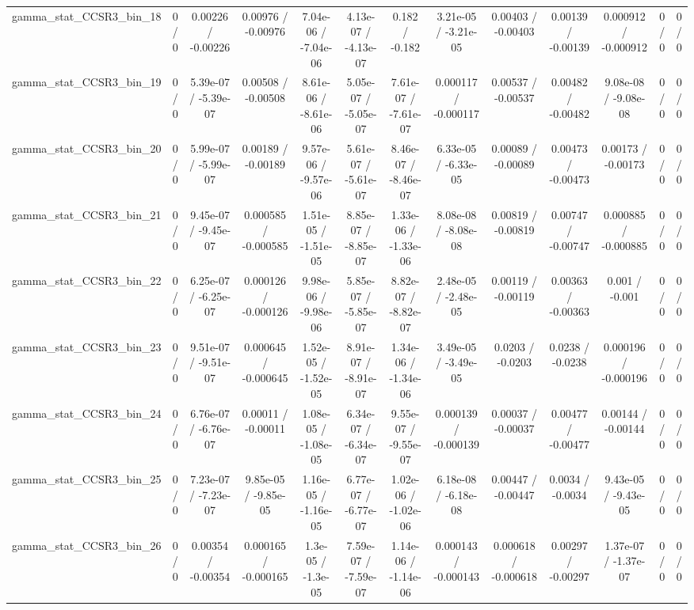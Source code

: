 \documentclass[10pt]{article}
\begin{document}
\begin{table}[htbp]
\begin{center}
\begin{tabular}{|c|c|c|c|c|c|c|c|c|c|c|c|c|}
  gamma_stat_CCSR3_bin_18 & 0 / 0 & 0.00226 / -0.00226 & 0.00976 / -0.00976 & 7.04e-06 / -7.04e-06 & 4.13e-07 / -4.13e-07 & 0.182 / -0.182 & 3.21e-05 / -3.21e-05 & 0.00403 / -0.00403 & 0.00139 / -0.00139 & 0.000912 / -0.000912 & 0 / 0 & 0 / 0 \\ 
  gamma_stat_CCSR3_bin_19 & 0 / 0 & 5.39e-07 / -5.39e-07 & 0.00508 / -0.00508 & 8.61e-06 / -8.61e-06 & 5.05e-07 / -5.05e-07 & 7.61e-07 / -7.61e-07 & 0.000117 / -0.000117 & 0.00537 / -0.00537 & 0.00482 / -0.00482 & 9.08e-08 / -9.08e-08 & 0 / 0 & 0 / 0 \\ 
  gamma_stat_CCSR3_bin_20 & 0 / 0 & 5.99e-07 / -5.99e-07 & 0.00189 / -0.00189 & 9.57e-06 / -9.57e-06 & 5.61e-07 / -5.61e-07 & 8.46e-07 / -8.46e-07 & 6.33e-05 / -6.33e-05 & 0.00089 / -0.00089 & 0.00473 / -0.00473 & 0.00173 / -0.00173 & 0 / 0 & 0 / 0 \\ 
  gamma_stat_CCSR3_bin_21 & 0 / 0 & 9.45e-07 / -9.45e-07 & 0.000585 / -0.000585 & 1.51e-05 / -1.51e-05 & 8.85e-07 / -8.85e-07 & 1.33e-06 / -1.33e-06 & 8.08e-08 / -8.08e-08 & 0.00819 / -0.00819 & 0.00747 / -0.00747 & 0.000885 / -0.000885 & 0 / 0 & 0 / 0 \\ 
  gamma_stat_CCSR3_bin_22 & 0 / 0 & 6.25e-07 / -6.25e-07 & 0.000126 / -0.000126 & 9.98e-06 / -9.98e-06 & 5.85e-07 / -5.85e-07 & 8.82e-07 / -8.82e-07 & 2.48e-05 / -2.48e-05 & 0.00119 / -0.00119 & 0.00363 / -0.00363 & 0.001 / -0.001 & 0 / 0 & 0 / 0 \\ 
  gamma_stat_CCSR3_bin_23 & 0 / 0 & 9.51e-07 / -9.51e-07 & 0.000645 / -0.000645 & 1.52e-05 / -1.52e-05 & 8.91e-07 / -8.91e-07 & 1.34e-06 / -1.34e-06 & 3.49e-05 / -3.49e-05 & 0.0203 / -0.0203 & 0.0238 / -0.0238 & 0.000196 / -0.000196 & 0 / 0 & 0 / 0 \\ 
  gamma_stat_CCSR3_bin_24 & 0 / 0 & 6.76e-07 / -6.76e-07 & 0.00011 / -0.00011 & 1.08e-05 / -1.08e-05 & 6.34e-07 / -6.34e-07 & 9.55e-07 / -9.55e-07 & 0.000139 / -0.000139 & 0.00037 / -0.00037 & 0.00477 / -0.00477 & 0.00144 / -0.00144 & 0 / 0 & 0 / 0 \\ 
  gamma_stat_CCSR3_bin_25 & 0 / 0 & 7.23e-07 / -7.23e-07 & 9.85e-05 / -9.85e-05 & 1.16e-05 / -1.16e-05 & 6.77e-07 / -6.77e-07 & 1.02e-06 / -1.02e-06 & 6.18e-08 / -6.18e-08 & 0.00447 / -0.00447 & 0.0034 / -0.0034 & 9.43e-05 / -9.43e-05 & 0 / 0 & 0 / 0 \\ 
  gamma_stat_CCSR3_bin_26 & 0 / 0 & 0.00354 / -0.00354 & 0.000165 / -0.000165 & 1.3e-05 / -1.3e-05 & 7.59e-07 / -7.59e-07 & 1.14e-06 / -1.14e-06 & 0.000143 / -0.000143 & 0.000618 / -0.000618 & 0.00297 / -0.00297 & 1.37e-07 / -1.37e-07 & 0 / 0 & 0 / 0 \\ 

\end{tabular}
\end{center}
\end{table}
\end{document}
